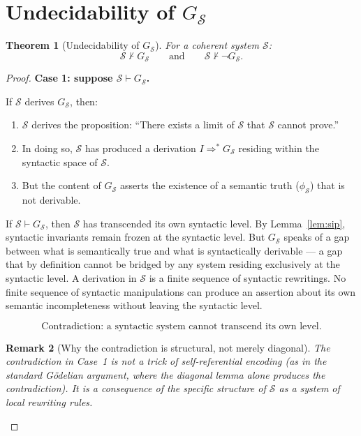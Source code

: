 \documentclass[11pt]{article}
\newtheorem{theorem}{Theorem}[section]
\newtheorem{remark}[theorem]{Remark}
\begin{document}
\section{Undecidability of $G_{\mathcal{S}}$}
\label{sec:undecidability}


\begin{theorem}[Undecidability of $G_{\mathcal{S}}$]
\label{thm:undecidability}
For a coherent system $\mathcal{S}$:
\[
  \mathcal{S} \not\vdash G_{\mathcal{S}}
  \qquad\text{and}\qquad
  \mathcal{S} \not\vdash \neg G_{\mathcal{S}}.
\]
\end{theorem}

\begin{proof}
\textbf{Case 1: suppose $\mathcal{S} \vdash G_{\mathcal{S}}$.}

If $\mathcal{S}$ derives $G_{\mathcal{S}}$, then:
\begin{enumerate}
  \item $\mathcal{S}$ derives the proposition: ``There exists a limit of
        $\mathcal{S}$ that $\mathcal{S}$ cannot prove.''
  \item In doing so, $\mathcal{S}$ has produced a derivation
        $I \Rightarrow^* G_{\mathcal{S}}$ residing within the syntactic
        space of $\mathcal{S}$.
  \item But the content of $G_{\mathcal{S}}$ asserts the existence of a
        semantic truth ($\phi_{\mathcal{S}}$) that is not derivable.
\end{enumerate}

If $\mathcal{S} \vdash G_{\mathcal{S}}$, then $\mathcal{S}$ has
transcended its own syntactic level. By Lemma~\ref{lem:sip}, syntactic
invariants remain frozen at the syntactic level. But $G_{\mathcal{S}}$
speaks of a gap between what is semantically true and what is
syntactically derivable --- a gap that by definition cannot be bridged by
any system residing exclusively at the syntactic level. A derivation in
$\mathcal{S}$ is a finite sequence of syntactic rewritings. No finite
sequence of syntactic manipulations can produce an assertion about its
own semantic incompleteness without leaving the syntactic level.

\[
  \boxed{\text{Contradiction: a syntactic system cannot transcend its own
  level.}}
\]

\begin{remark}[Why the contradiction is structural, not merely diagonal]
\label{rem:structural-contradiction}
The contradiction in Case~1 is not a trick of self-referential encoding
(as in the standard G\"odelian argument, where the diagonal lemma alone
produces the contradiction). It is a consequence of the specific
structure of $\mathcal{S}$ as a system of local rewriting rules.


\end{remark}
\end{proof}
\end{document}

